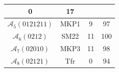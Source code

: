 \begin{table}[!t]
\begin{tabular}{|c|c||c|c|}
0

&

17

\\ \hline

$\mathcal{A}_{5}(0121211)$

&

MKP1


&

9

&

97

\\ \hline

$\mathcal{A}_{6}(0212)$

&

SM22


&

11

&

100

\\ \hline

$\mathcal{A}_{7}(02010)$

&

MKP3


&

11

&

98

\\ \hline

$\mathcal{A}_{8}(02121)$

&

Tfr


&

0

&

94

\\ \hline

 
\end{tabular}
\end{table}








%
%

